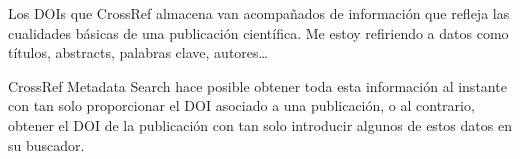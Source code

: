 Los DOIs que CrossRef almacena van acompañados de información que refleja las cualidades básicas de una publicación científica. Me estoy refiriendo a datos como títulos, abstracts, palabras clave, autores…

CrossRef Metadata Search hace posible obtener toda esta información al instante con tan solo proporcionar el DOI asociado a una publicación, o al contrario, obtener el DOI de la publicación con tan solo introducir algunos de estos datos en su buscador.








